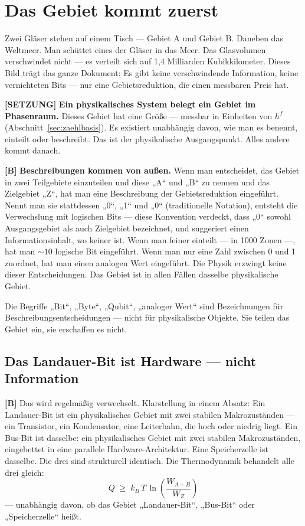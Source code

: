 \bigskip

\section{Das Gebiet kommt zuerst}

Zwei Gläser stehen auf einem Tisch --- Gebiet A und Gebiet B. Daneben das
Weltmeer. Man schüttet eines der Gläser in das Meer. Das Glasvolumen verschwindet
nicht --- es verteilt sich auf 1,4 Milliarden Kubikkilometer. Dieses Bild trägt
das ganze Dokument: Es gibt keine verschwindende Information, keine vernichteten
Bits --- nur eine Gebietsreduktion, die einen messbaren Preis hat.

\textbf{[SETZUNG]} \textbf{Ein physikalisches System belegt ein Gebiet im Phasenraum.} Dieses
Gebiet hat eine Größe --- messbar in Einheiten von $h^f$ (Abschnitt~\ref{sec:zaehlbasis}).
Es existiert unabhängig davon, wie man es benennt, einteilt oder beschreibt. Das
ist der physikalische Ausgangspunkt. Alles andere kommt danach.

\textbf{[B]} \textbf{Beschreibungen kommen von außen.} Wenn man entscheidet, das Gebiet in
zwei Teilgebiete einzuteilen und diese „A“ und „B“ zu nennen und das Zielgebiet
„Z“, hat man eine Beschreibung der Gebietsreduktion eingeführt. Nennt man sie
stattdessen „0“, „1“ und „0“ (traditionelle Notation), entsteht die Verwechslung
mit logischen Bits --- diese Konvention verdeckt, dass „0“ sowohl Ausgangsgebiet
als auch Zielgebiet bezeichnet, und suggeriert einen Informationsinhalt, wo keiner
ist. Wenn man feiner einteilt --- in 1000 Zonen ---, hat man ${\sim}10$ logische
Bit eingeführt. Wenn man nur eine Zahl zwischen 0 und 1 zuordnet, hat man einen
analogen Wert eingeführt. Die Physik erzwingt keine dieser Entscheidungen. Das
Gebiet ist in allen Fällen dasselbe physikalische Gebiet.

Die Begriffe „Bit“, „Byte“, „Qubit“, „analoger Wert“ sind Bezeichnungen für
Beschreibungsentscheidungen --- nicht für physikalische Objekte. Sie teilen das
Gebiet ein, sie erschaffen es nicht.

\subsection{Das Landauer-Bit ist Hardware --- nicht Information}

\textbf{[B]} Das wird regelmäßig verwechselt. Klarstellung in einem Absatz: Ein
Landauer-Bit ist ein physikalisches Gebiet mit zwei stabilen Makrozuständen ---
ein Transistor, ein Kondensator, eine Leiterbahn, die hoch oder niedrig liegt. Ein
Bus-Bit ist dasselbe: ein physikalisches Gebiet mit zwei stabilen Makrozuständen,
eingebettet in eine parallele Hardware-Architektur. Eine Speicherzelle ist
dasselbe. Die drei sind strukturell identisch. Die Thermodynamik behandelt alle
drei gleich:
\[
  Q \;\ge\; k_B\,T\,\ln\!\left(\frac{W_{A+B}}{W_Z}\right)
\]
--- unabhängig davon, ob das Gebiet „Landauer-Bit“, „Bus-Bit“ oder
„Speicherzelle“ heißt.

